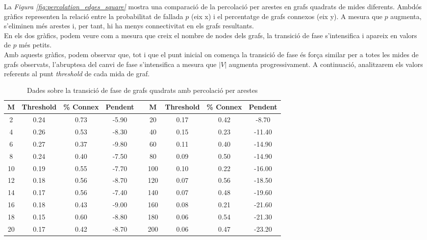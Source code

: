 \documentclass[a4paper]{article}
\begin{document}
	La \textit{Figura \ref{fig:percolation_edges_square}} mostra una comparació de la percolació per arestes en grafs quadrats de mides diferents. Ambdós gràfics representen la relació entre la probabilitat de fallada $p$ (eix x) i el percentatge de grafs connexos (eix y). A mesura que $p$ augmenta, s'eliminen més arestes i, per tant, hi ha menys connectivitat en els grafs resultants. \\
	
	En els dos gràfics, podem veure com a mesura que creix el nombre de nodes dels grafs, la transició de fase s'intensifica i apareix en valors de $p$ més petits. \\
	
	Amb aquests gràfics, podem observar que, tot i que el punt inicial on comença la transició de fase és força similar per a totes les mides de grafs observats, l'abruptesa del canvi de fase s'intensifica a mesura que $|V|$ augmenta progressivament. A continuació, analitzarem els valors referents al punt \textit{threshold} de cada mida de graf.
	
	\begin{table}[H]
		\centering
		\begin{tabular}{|c|c|c|c|c|c|c|c|c|}
			\hline
			\rowcolor{gray!30}
			M & Threshold & \% Connex & Pendent &   & M & Threshold & \% Connex & Pendent \\ \hline
			2 & 0.24 & 0.73 & -5.90 &   &  20 & 0.17 & 0.42 & -8.70 \\ \hline
			4 & 0.26 & 0.53 & -8.30 &   &  40 & 0.15 & 0.23 & -11.40 \\ \hline
			6 & 0.27 & 0.37 & -9.80 &   &  60 & 0.11 & 0.40 & -14.90 \\ \hline
			8 & 0.24 & 0.40 & -7.50 &   &  80 & 0.09 & 0.50 & -14.90 \\ \hline
			10 & 0.19 & 0.55 & -7.70 &   &  100 & 0.10 & 0.22 & -16.00 \\ \hline
			12 & 0.18 & 0.56 & -8.70 &   &  120 & 0.07 & 0.56 & -18.50 \\ \hline
			14 & 0.17 & 0.56 & -7.40 &   &  140 & 0.07 & 0.48 & -19.60 \\ \hline
			16 & 0.18 & 0.43 & -9.00 &   &  160 & 0.08 & 0.21 & -21.60 \\ \hline
			18 & 0.15 & 0.60 & -8.80 &   &  180 & 0.06 & 0.54 & -21.30 \\ \hline
			20 & 0.17 & 0.42 & -8.70 &   &  200 & 0.06 & 0.47 & -23.20 \\ \hline
		\end{tabular}
		\caption{Dades sobre la transició de fase de grafs quadrats amb percolació per arestes}
		\label{tab:data_edges_square}
	\end{table}
	
\end{document}
